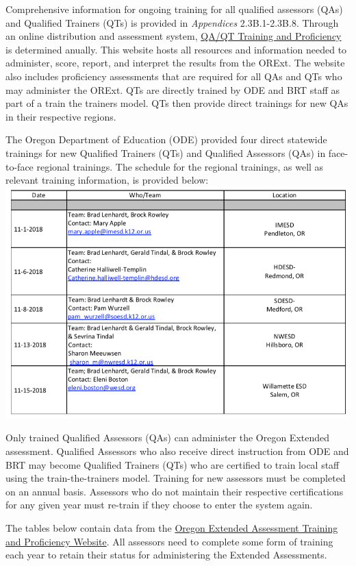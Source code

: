 \documentclass[]{article}
\begin{document}
Comprehensive information for ongoing training for all qualified
assessors (QAs) and Qualified Trainers (QTs) is provided in
\emph{Appendices} 2.3B.1-2.3B.8. Through an online distribution and
assessment system, \color{link}\href{https://or.k12test.com/}{QA/QT
Training and Proficiency} \color{black} is determined anually. This
website hosts all resources and information needed to administer, score,
report, and interpret the results from the ORExt. The website also
includes proficiency assessments that are required for all QAs and QTs
who may administer the ORExt. QTs are directly trained by ODE and BRT
staff as part of a train the trainers model. QTs then provide direct
trainings for new QAs in their respective regions.

The Oregon Department of Education (ODE) provided four direct statewide
trainings for new Qualified Trainers (QTs) and Qualified Assessors (QAs)
in face-to-face regional trainings. The schedule for the regional
trainings, as well as relevant training information, is provided below:
\FloatBarrier \includegraphics{Figures/TrainingSched/TraingSched.png}

Only trained Qualified Assessors (QAs) can administer the Oregon
Extended assessment. Qualified Assessors who also receive direct
instruction from ODE and BRT may become Qualified Trainers (QTs) who are
certified to train local staff using the train-the-trainers model.
Training for new assessors must be completed on an annual basis.
Assessors who do not maintain their respective certifications for any
given year must re-train if they choose to enter the system again.

The tables below contain data from the
\color{link}\href{http://or.k12test.com/}{Oregon Extended Assessment
Training and Proficiency Website}\color{black}. All assessors need to
complete some form of training each year to retain their status for
administering the Extended Assessments.
\end{document}
